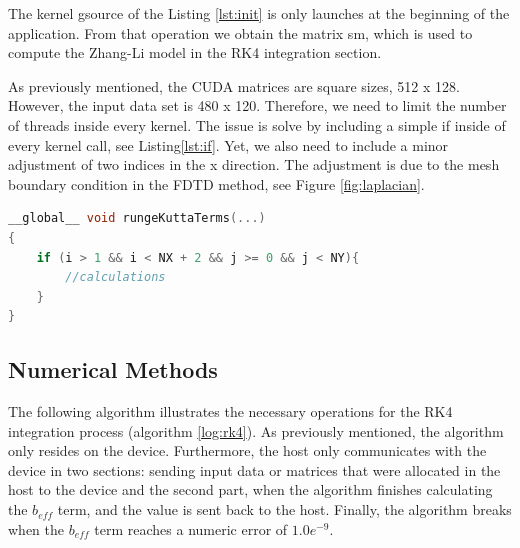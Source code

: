 The kernel {\listf gsource} of the Listing \ref{lst:init} is only launches at the beginning of the application. From that operation we obtain the matrix {\listf sm}, which is used to compute the Zhang-Li model in the RK4 integration section.

As previously mentioned, the CUDA matrices are square sizes, 512 x 128. However, the input data set is 480 x 120. Therefore, we need to limit the number of threads inside every kernel. The issue is solve by including a simple {\listf if} inside of every kernel call, see Listing\ref{lst:if}. Yet, we also need to include a minor adjustment of two indices in the x direction. The adjustment is due to the mesh boundary condition in the FDTD method, see Figure \ref{fig:laplacian}.

\begin{lstlisting}[language=C++, label={lst:if}, caption={Limits the threads executing inside a kernel}]
__global__ void rungeKuttaTerms(...)
{
    if (i > 1 && i < NX + 2 && j >= 0 && j < NY){
    	//calculations
    }
}
\end{lstlisting}

\subsection{Numerical Methods}

The following algorithm illustrates the necessary operations for the RK4 integration process (algorithm \ref{log:rk4}). As previously mentioned, the algorithm only resides on the device. Furthermore, the host only communicates with the device in two sections: sending input data or matrices that were allocated in the host to the device and the second part, when the algorithm finishes calculating the $b_{eff}$ term, and the value is sent back to the host. Finally, the algorithm breaks when the $b_{eff}$ term reaches a numeric error of $1.0e^{-9}$.

